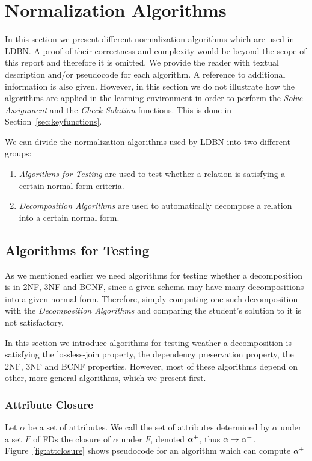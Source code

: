 \section{Normalization Algorithms}
\label{sec:alg}
In this section we present different normalization algorithms which are used
in LDBN. A proof of their correctness and complexity would be beyond the 
scope of this report and therefore it is omitted. We provide the
reader with textual description and/or pseudocode for each algorithm. 
A reference to additional information is also given. However, in this section we do not
illustrate how the algorithms are applied in the learning environment in order
to perform the \textit{Solve Assignment} and the \textit{Check Solution} functions.
This is done in Section~\ref{sec:keyfunctions}.

We can divide the normalization algorithms used by LDBN into two different groups:

\begin{enumerate}
  \item \textit{Algorithms for Testing} are used to test whether a relation is satisfying a certain normal form criteria.
  \item \textit{Decomposition Algorithms} are used to automatically decompose a relation into a certain normal form.
\end{enumerate}

\subsection{Algorithms for Testing}
\label{sec:algtest}
As we mentioned earlier we need algorithms for testing whether a decomposition 
is in 2NF, 3NF and BCNF, since a given schema may have many decompositions into a given normal form. Therefore,
simply computing one such decomposition with the \textit{Decomposition Algorithms} and comparing the student's solution to it is
not satisfactory. 

In this section we introduce algorithms for testing weather a decomposition 
is satisfying the lossless-join property, the
dependency preservation property, the 2NF, 3NF and BCNF properties. 
However, most of these algorithms depend on other, more general
algorithms, which we present first.  

\subsubsection{Attribute Closure}
Let $\alpha$  be a set of attributes. 
We call the set of attributes determined by $\alpha$ under a set $F$ of 
FDs the closure of $\alpha$ under $F$, denoted $\alpha\sp{+}$, thus \(\alpha \rightarrow \alpha\sp{+}\).
Figure~\ref{fig:attclosure} shows  pseudocode for an algorithm which can compute $\alpha\sp{+}$

